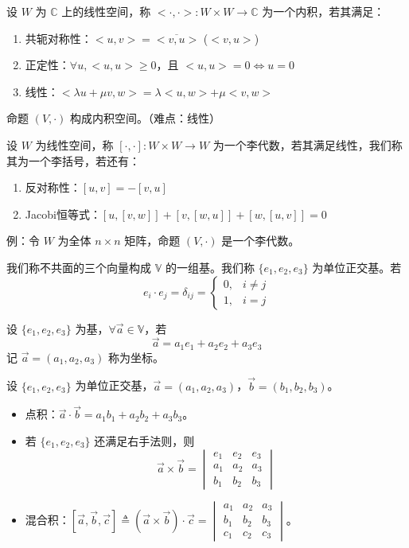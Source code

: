 \documentclass[lang=cn,10pt,thmcnt=section]{elegantbook}
\begin{document}
\begin{definition}[内积]
    设 $W$ 为 $\mathbb{C}$ 上的线性空间，称 $<\cdot,\cdot> : W \times W \rightarrow \mathbb{C}$ 为一个内积，若其满足：
    \begin{enumerate}
        \item 共轭对称性：$<u,v> = \overline{<v,u>}$ ($<v,u>$)
        \item 正定性：$\forall u, <u,u> \geq 0$，且 $<u,u> = 0 \Leftrightarrow u = 0$
        \item 线性：$<\lambda u + \mu v, w> = \lambda <u,w> + \mu <v,w>$
    \end{enumerate}
    命题 $(V, \cdot)$ 构成内积空间。（难点：线性）
    \end{definition}
    
    \begin{definition}[李括号]
    设 $W$ 为线性空间，称 $[ \cdot, \cdot ] : W \times W \rightarrow W$ 为一个李代数，若其满足线性，我们称其为一个李括号，若还有：
    \begin{enumerate}
        \item 反对称性：$[u,v] = -[v,u]$
        \item Jacobi恒等式：$[u,[v,w]] + [v,[w,u]] + [w,[u,v]] = 0$
    \end{enumerate}
    例：令 $W$ 为全体 $n \times n$ 矩阵，命题 $(V, \cdot)$ 是一个李代数。
\end{definition}
\begin{definition}[基和坐标]
    我们称不共面的三个向量构成 $\mathbb{V}$ 的一组基。我们称 $\{e_1, e_2, e_3\}$ 为单位正交基。若
\[
e_i \cdot e_j = \delta_{ij} = 
\begin{cases} 
0, & i \neq j \\
1, & i = j 
\end{cases}
\]

设 $\{e_1, e_2, e_3\}$ 为基，$\forall \vec{a} \in \mathbb{V}$，若
\[
\vec{a} = a_1 e_1 + a_2 e_2 + a_3 e_3
\]
记 $\vec{a} = (a_1, a_2, a_3)$ 称为坐标。
\end{definition}
\begin{proposition}[点积、叉积、混合积的公式]
设 $\{e_1, e_2, e_3\}$ 为单位正交基，$\vec{a} = (a_1, a_2, a_3)$，$\vec{b} = (b_1, b_2, b_3)$。
\begin{itemize}
    \item 点积：$\vec{a} \cdot \vec{b} = a_1b_1 + a_2b_2 + a_3b_3$。
    \item 若 $\{e_1, e_2, e_3\}$ 还满足右手法则，则
    \[
    \vec{a} \times \vec{b} = 
    \begin{vmatrix}
    e_1 & e_2 & e_3 \\
    a_1 & a_2 & a_3 \\
    b_1 & b_2 & b_3
    \end{vmatrix}
    \]
    \item 混合积：$[\vec{a}, \vec{b}, \vec{c}] \triangleq (\vec{a} \times \vec{b}) \cdot \vec{c} = 
    \begin{vmatrix}
    a_1 & a_2 & a_3 \\
    b_1 & b_2 & b_3 \\
    c_1 & c_2 & c_3
    \end{vmatrix}$。
\end{itemize}
\end{proposition}
\end{document}
